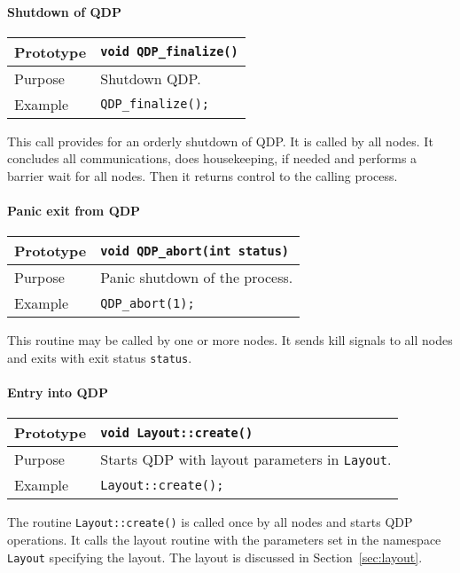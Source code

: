 \documentclass[12pt,letterpaper]{article}
\begin{document}
\paragraph{Shutdown of QDP}

\begin{flushleft}
  \begin{tabular}{|l|l|}
  \hline
  Prototype      & \verb|void QDP_finalize()|\\
    \hline
  Purpose        & Shutdown QDP. \\
\hline
  Example  & \verb|QDP_finalize();| \\
   \hline
 \end{tabular}
\end{flushleft}
%
This call provides for an orderly shutdown of QDP.  It is called by
all nodes. It concludes all communications, does housekeeping, if
needed and performs a barrier wait for all nodes.  Then it returns
control to the calling process.

\paragraph{Panic exit from QDP}

\begin{flushleft}
  \begin{tabular}{|l|l|}
  \hline
  Prototype      & \verb|void QDP_abort(int status)|\\
    \hline
  Purpose        & Panic shutdown of the process. \\
\hline
  Example  & \verb|QDP_abort(1);| \\
   \hline
 \end{tabular}
\end{flushleft}
%
This routine may be called by one or more nodes.  It sends kill
signals to all nodes and exits with exit status \verb|status|.

\paragraph{Entry into QDP}

\begin{flushleft}
  \begin{tabular}{|l|l|}
  \hline
  Prototype      & \verb|void Layout::create()|\\
    \hline
  Purpose        & Starts QDP with layout parameters in \verb|Layout|. \\
\hline
  Example  & \verb|Layout::create();| \\
   \hline
 \end{tabular}
\end{flushleft}
%
The routine \verb|Layout::create()| is called once by all nodes and
starts QDP operations. It calls the layout routine with the
parameters set in the namespace \verb|Layout| specifying the layout.
The layout is discussed in Section~\ref{sec:layout}.
\end{document}
